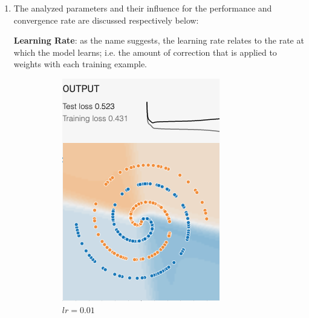 \documentclass[12pt,a4paper]{article}
\begin{document}
\begin{enumerate}
		\vspace{-0.7cm}
		\item The analyzed parameters and their influence for the performance and convergence rate are discussed respectively below:
	
		\noindent \textbf{\small Learning Rate}: as the name suggests, the learning rate relates to the rate at which the model learns; i.e. the amount of correction that is applied to weights with each training example. 
			\begin{figure}[H]
			\centering
			\begin{subfigure}[H]{0.2\textwidth}
				\centering
				\includegraphics[width=\textwidth]{Figures/lr/lol0}
				\caption{$lr=0.01$}
			\end{subfigure}
			\begin{subfigure}[H]{0.2\textwidth}
				\centering

\end{subfigure}
\end{figure}
\end{enumerate}
\end{document}
